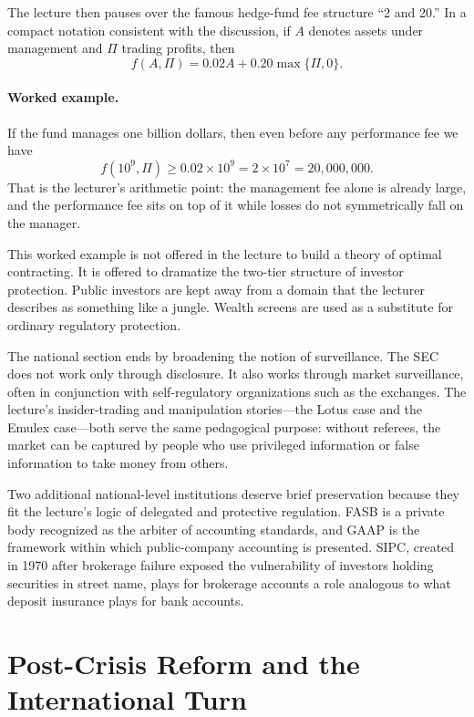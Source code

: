 The lecture then pauses over the famous hedge-fund fee structure ``2 and 20.'' In a compact notation consistent with the discussion, if \(A\) denotes assets under management and \(\Pi\) trading profits, then
\begin{equation}
f(A,\Pi)=0.02A+0.20\max\{\Pi,0\}.
\end{equation}

\paragraph{Worked example.} If the fund manages one billion dollars, then even before any performance fee we have
\begin{equation}
f(10^9,\Pi)\ge 0.02\times 10^9 = 2\times 10^7 = 20{,}000{,}000.
\end{equation}
That is the lecturer's arithmetic point: the management fee alone is already large, and the performance fee sits on top of it while losses do not symmetrically fall on the manager.

This worked example is not offered in the lecture to build a theory of optimal contracting. It is offered to dramatize the two-tier structure of investor protection. Public investors are kept away from a domain that the lecturer describes as something like a jungle. Wealth screens are used as a substitute for ordinary regulatory protection.

The national section ends by broadening the notion of surveillance. The SEC does not work only through disclosure. It also works through market surveillance, often in conjunction with self-regulatory organizations such as the exchanges. The lecture's insider-trading and manipulation stories---the Lotus case and the Emulex case---both serve the same pedagogical purpose: without referees, the market can be captured by people who use privileged information or false information to take money from others.

Two additional national-level institutions deserve brief preservation because they fit the lecture's logic of delegated and protective regulation. FASB is a private body recognized as the arbiter of accounting standards, and GAAP is the framework within which public-company accounting is presented. SIPC, created in 1970 after brokerage failure exposed the vulnerability of investors holding securities in street name, plays for brokerage accounts a role analogous to what deposit insurance plays for bank accounts.

\section{Post-Crisis Reform and the International Turn}

